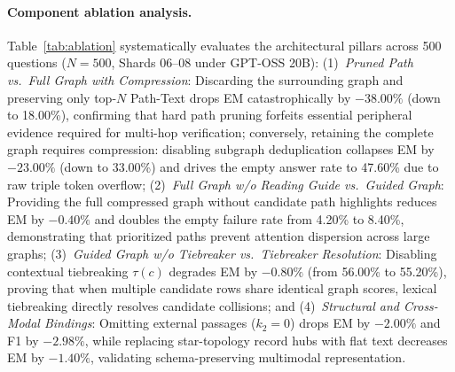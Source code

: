 \documentclass[runningheads]{llncs}
\begin{document}
\paragraph{Component ablation analysis.}
Table~\ref{tab:ablation} systematically evaluates the architectural pillars across 500 questions ($N=500$, Shards 06--08 under GPT-OSS 20B):
(1)~\emph{Pruned Path vs.\ Full Graph with Compression}: Discarding the surrounding graph and preserving only top-$N$ Path-Text drops EM catastrophically by $-38.00\%$ (down to 18.00\%), confirming that hard path pruning forfeits essential peripheral evidence required for multi-hop verification; conversely, retaining the complete graph requires compression: disabling subgraph deduplication collapses EM by $-23.00\%$ (down to 33.00\%) and drives the empty answer rate to 47.60\% due to raw triple token overflow;
(2)~\emph{Full Graph w/o Reading Guide vs.\ Guided Graph}: Providing the full compressed graph without candidate path highlights reduces EM by $-0.40\%$ and doubles the empty failure rate from 4.20\% to 8.40\%, demonstrating that prioritized paths prevent attention dispersion across large graphs;
(3)~\emph{Guided Graph w/o Tiebreaker vs.\ Tiebreaker Resolution}: Disabling contextual tiebreaking $\tau(c)$ degrades EM by $-0.80\%$ (from 56.00\% to 55.20\%), proving that when multiple candidate rows share identical graph scores, lexical tiebreaking directly resolves candidate collisions; and
(4)~\emph{Structural and Cross-Modal Bindings}: Omitting external passages ($k_2=0$) drops EM by $-2.00\%$ and F1 by $-2.98\%$, while replacing star-topology record hubs with flat text decreases EM by $-1.40\%$, validating schema-preserving multimodal representation.
\end{document}
